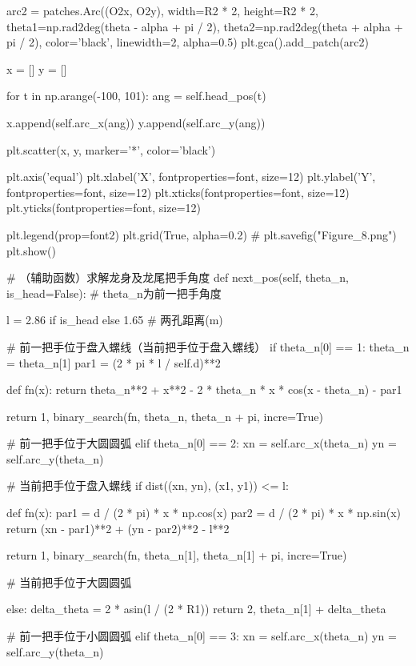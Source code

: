 \documentclass[withoutpreface,bwprint]{cumcmthesis}
\begin{document}
\begin{CodeText}
   arc2 = patches.Arc((O2x, O2y), width=R2 * 2, height=R2 * 2, theta1=np.rad2deg(theta -
             alpha + pi / 2), theta2=np.rad2deg(theta + alpha + pi / 2), color='black',
             linewidth=2, alpha=0.5)
   plt.gca().add_patch(arc2)

   x = []
   y = []

   for t in np.arange(-100, 101):
      ang = self.head_pos(t)

      x.append(self.arc_x(ang))
      y.append(self.arc_y(ang))

   plt.scatter(x, y, marker='*', color='black')

   plt.axis('equal')
   plt.xlabel('X', fontproperties=font, size=12)
   plt.ylabel('Y', fontproperties=font, size=12)
   plt.xticks(fontproperties=font, size=12)
   plt.yticks(fontproperties=font, size=12)

   plt.legend(prop=font2)
   plt.grid(True, alpha=0.2)
   # plt.savefig("Figure_8.png")
   plt.show()

# （辅助函数）求解龙身及龙尾把手角度
def next_pos(self, theta_n, is_head=False): # theta_n为前一把手角度

   l = 2.86 if is_head else 1.65 # 两孔距离(m)

   # 前一把手位于盘入螺线（当前把手位于盘入螺线）
   if theta_n[0] == 1:
      theta_n = theta_n[1]
      par1 = (2 * pi * l / self.d)**2

      def fn(x):
         return theta_n**2 + x**2 - 2 * theta_n * x * cos(x - theta_n) - par1

      return 1, binary_search(fn, theta_n, theta_n + pi, incre=True)

   # 前一把手位于大圆圆弧
   elif theta_n[0] == 2:
      xn = self.arc_x(theta_n)
      yn = self.arc_y(theta_n)

      # 当前把手位于盘入螺线
      if dist((xn, yn), (x1, y1)) <= l:

         def fn(x):
                par1 = d / (2 * pi) * x * np.cos(x)
                par2 = d / (2 * pi) * x * np.sin(x)
                return (xn - par1)**2 + (yn - par2)**2 - l**2

         return 1, binary_search(fn, theta_n[1], theta_n[1] + pi, incre=True)

      # 当前把手位于大圆圆弧

   else:
      delta_theta = 2 * asin(l / (2 * R1))
      return 2, theta_n[1] + delta_theta

# 前一把手位于小圆圆弧
elif theta_n[0] == 3:
   xn = self.arc_x(theta_n)
   yn = self.arc_y(theta_n)


\end{CodeText}
\end{document}
